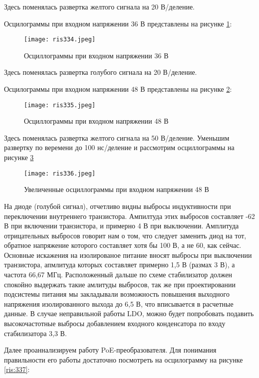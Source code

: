 Здесь поменялась развертка желтого сигнала на 20 В/деление. 

Осцилограммы при входном напряжении 36 В представлены на рисунке \ref{ris:334}:

\begin{figure}[H]
    \centering
    \texttt{[image: ris334.jpeg]}
    \caption{Осциллограммы при входном напряжении 36 В}
    \label{ris:334}
\end{figure}

Здесь поменялась развертка голубого сигнала на 20 В/деление. 

Осцилограммы при входном напряжении 48 В представлены на рисунке \ref{ris:335}:

\begin{figure}[H]
    \centering
    \texttt{[image: ris335.jpeg]}
    \caption{Осциллограммы при входном напряжении 48 В}
    \label{ris:335}
\end{figure}

Здесь поменялась развертка желтого сигнала на 50 В/деление. Уменьшим развертку по веремени до 100 нс/деление
и рассмотрим осциллограммы на рисунке \ref{ris:336}


\begin{figure}[H]
    \centering
    \texttt{[image: ris336.jpeg]}
    \caption{Увеличенные осциллограммы при входном напряжении 48 В}
    \label{ris:336}
\end{figure}

На диоде (голубой сигнал), отчетливо видны выбросы индуктивности при переключении внутреннего транзистора. 
Ампилтуда этих выбросов составляет -62 В при включении транзистора, и примерно 4 В при выключении.
Амплитуда отрицательных выбросов говорит нам о том, что следует заменить диод на тот, обратное напряжение которого
составляет хотя бы 100 В, а не 60, как сейчас. Основные искажения на изолированое питание вносят выбросы при 
выключении транзистора, апмлитуда которых составляет примерно 1,5 В (размах 3 В), а частота 66,67 МГц. 
Расположенный дальше по схеме стабилизатор должен спокойно выдержать такие амлитуды выбросов, так же при
проектировании подсистемы питания мы закладывали возможность повышения выходного напряжения изолированного 
выхода до 6,5 В, что вписывается в расчетные данные. В случае неправильной работы LDO, можно будет попробовать
подавить высокочастотные выбросы добавлением входного конденсатора по входу стабилизатора 3,3 В.

Далее проаннализируем работу PoE-преобразователя. Для понимания правильности его работы достаточно посмотреть
на осцилограмму на рисунке \ref{ris:337}:

